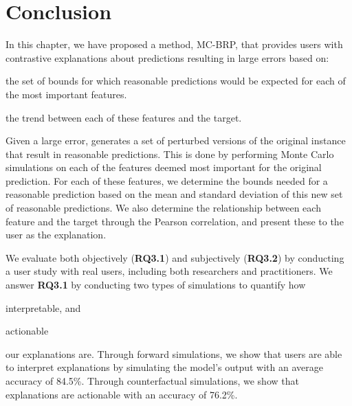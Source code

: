 
\section{Conclusion}
\label{section:7}
In this chapter, we have proposed a method, MC-BRP, that provides users with contrastive explanations about predictions resulting in large errors based on:
\begin{inparaenum}[(i)]
\item the set of bounds for which reasonable predictions would be expected for each of the most important features. 
\item the trend between each of these features and the target.
\end{inparaenum}

\noindent%
Given a large error, \OurMethod{} generates a set of perturbed versions of the original instance that result in reasonable predictions. 
This is done by performing Monte Carlo simulations on each of the features deemed most important for the original prediction. 
For each of these features, we determine the bounds needed for a reasonable prediction based on the mean and standard deviation of this new set of reasonable predictions. 
We also determine the relationship between each feature and the target through the Pearson correlation, and present these to the user as the explanation. 

We evaluate \OurMethod{} both objectively (\textbf{RQ3.1}) and subjectively (\textbf{RQ3.2}) by conducting a user study with  real users, including both researchers and practitioners. 
We answer \textbf{RQ3.1} by conducting two types of simulations to quantify how 
\begin{inparaenum}[(i)]
\item interpretable, and 
\item actionable 
\end{inparaenum}
our explanations are. 
Through forward simulations, we show that users are able to interpret \OurMethod{} explanations by simulating the model's output with an average accuracy of 84.5\%. 
Through counterfactual simulations, 
we show that \OurMethod{} explanations are actionable with an accuracy of 76.2\%. 

